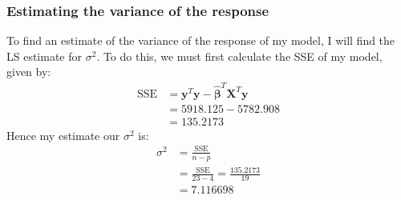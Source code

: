 \documentclass[12pt]{article}
\newcommand{\vect}[1]{\boldsymbol{#1}}
\newcommand{\trans}[1]{#1^T}
\newcommand{\est}[1]{\hat{#1}}
\begin{document}
\subsubsection{Estimating the variance of the response}
To find an estimate of the variance of the response of my model, I will find the LS estimate for $\sigma^2$. To do this, we must first calculate the SSE of my model, given by:
\begin{align}
  \text{SSE} & = \trans{\vect{y}}\vect{y} - \trans{\est{\vect{\beta}}}\trans{\vect{X}}\vect{y} \nonumber \\
             & = 5918.125 - 5782.908 \nonumber \\
             & = 135.2173 \label{lin_SSE}
\end{align}
Hence my estimate our $\sigma^2$ is:
\begin{align}
  \sigma^2 & = \frac{\text{SSE}}{n-p} \nonumber \\
           & = \frac{\text{SSE}}{23-4} = \frac{135.2173}{19} \nonumber \\
           & = 7.116698 \label{lin_var}
\end{align}
\end{document}
